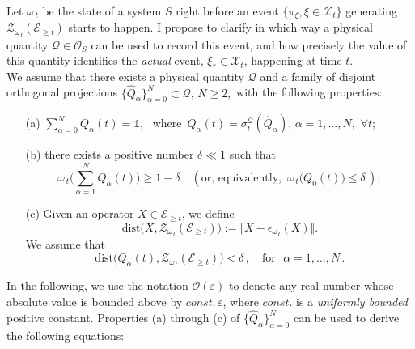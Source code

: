 \documentclass[a4paper,11pt]{article}
\begin{document}
\begin{enumerate}
{Let $\omega_{\,t}$ be the state of a system $S$ right before an event $\lbrace \pi_{\xi}, \xi \in \mathcal{X}_{t}\rbrace$ generating 
$\mathcal{Z}_{\omega_{\,t}}(\mathcal{E}_{\geq t})$ starts to happen. I propose to clarify in which way a physical quantity 
$\mathcal{Q} \in \mathcal{O}_{S}$ can be used to record this event, and how precisely the value of this quantity identifies the \textit{actual} event, $\xi_{*} \in \mathcal{X}_t$, happening at time $t$.\\
We assume that there exists a physical quantity $\mathcal{Q}$ and a family of disjoint orthogonal projections $\lbrace \widehat{Q}_{\alpha} \rbrace_{\alpha=0}^{N} \subset \mathcal{Q},\, N\geq 2,$ with the following properties:
\begin{enumerate}
\item[(a)]{$\sum_{\alpha=0}^{N} Q_{\alpha}(t) = \mathds{1}$, \, where\, $Q_{\alpha}(t) = \sigma_{t}^{\mathcal{Q}}(\widehat{Q}_{\alpha}),\,
\alpha = 1,\dots, N, \,\, \forall t$;}
\item[(b)]{there exists a positive number $\delta\ll 1$ such that 
$$\omega_{\,t}\Big(\sum_{\alpha=1}^{N}Q_{\alpha}(t)\Big) \geq 1-\delta \quad (\text{or, equivalently,} \,\,\, \omega_{\,t}\big(Q_{0}(t)\big) \leq \delta\,); $$}
\item[(c)]{Given an operator $X\in \mathcal{E}_{\geq t}$, we define 
$$\text{dist}\big(X, \mathcal{Z}_{\omega_{\,t}}(\mathcal{E}_{\geq t})\big):= \Vert X - \epsilon_{\omega_{\,t}} (X) \Vert.$$
We assume that
\begin{equation}\label{dist}
\text{dist} \big(Q_{\alpha}(t), \mathcal{Z}_{\omega_{\,t}}(\mathcal{E}_{\geq t})\big)  < \delta\,, \quad \text{for }\,\, \alpha=1,\dots, N\,.
\end{equation}
}
\end{enumerate}
In the following, we use the notation $\mathcal{O}(\varepsilon)$ to denote any real number whose absolute value is bounded above by
$const.\, \varepsilon$, where $const.$ is a \textit{uniformly bounded} positive constant. Properties (a) through (c) of 
$\lbrace \widehat{Q}_{\alpha} \rbrace_{\alpha=0}^{N}$ can be used to derive the following equations:

}
\end{enumerate}
\end{document}
